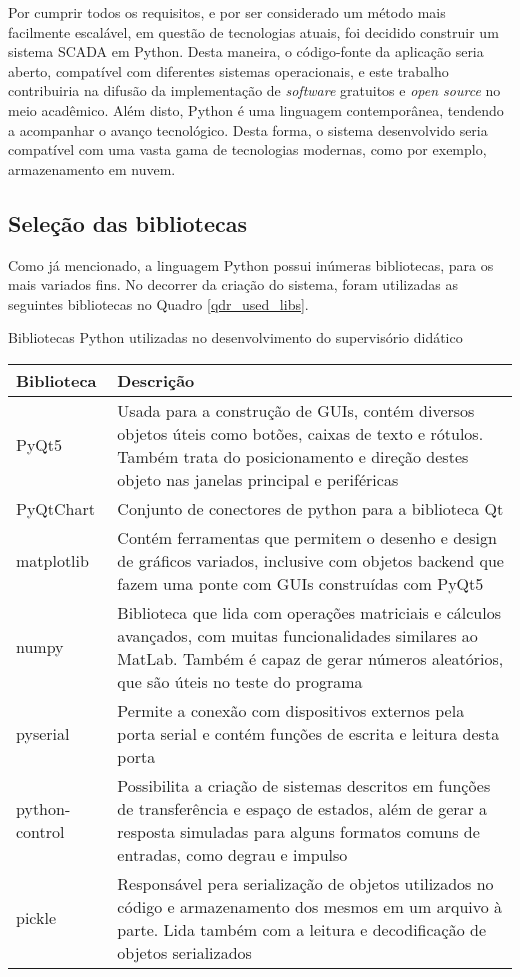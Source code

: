Por cumprir todos os requisitos, e por ser considerado um método mais facilmente escalável, em questão de tecnologias atuais, foi decidido construir um sistema SCADA em Python. Desta maneira, o código-fonte da aplicação seria aberto, compatível com diferentes sistemas operacionais, e este trabalho contribuiria na difusão da implementação de \textit{software} gratuitos e \textit{open source} no meio acadêmico. Além disto, Python é uma linguagem contemporânea, tendendo a acompanhar o avanço tecnológico. Desta forma, o sistema desenvolvido seria compatível com uma vasta gama de tecnologias modernas, como por exemplo, armazenamento em nuvem.

\subsection{Seleção das bibliotecas}

Como já mencionado, a linguagem Python possui inúmeras bibliotecas, para os mais variados fins. No decorrer da criação do sistema, foram utilizadas as seguintes bibliotecas no Quadro \ref{qdr_used_libs}.

\begin{quadro}
	\centering
	\caption{Bibliotecas Python utilizadas no desenvolvimento do supervisório didático}
	\begin{tabular}{|m{5em}|m{25em}|}
		\hline
		Biblioteca & Descrição \\
		\hline
		PyQt5 & Usada para a construção de GUIs, contém diversos objetos úteis como botões, caixas de texto e rótulos. Também trata do posicionamento e direção destes objeto nas janelas principal e periféricas \cite{pyqtdoc} \\
		\hline
		PyQtChart & Conjunto de conectores de python para a biblioteca Qt \\
		\hline
		matplotlib & Contém ferramentas que permitem o desenho e design de gráficos variados, inclusive com objetos backend que fazem uma ponte com GUIs construídas com PyQt5 \cite{hunter2007matplotlib} \\
		\hline
		numpy & Biblioteca que lida com operações matriciais e cálculos avançados, com muitas funcionalidades similares ao MatLab. Também é capaz de gerar números aleatórios, que são úteis no teste do programa \cite{harris2020array} \\
		\hline
		pyserial & Permite a conexão com dispositivos externos pela porta serial e contém funções de escrita e leitura desta porta \cite{pyserial} \\
		\hline
		python-control & Possibilita a criação de sistemas descritos em funções de transferência e espaço de estados, além de gerar a resposta simuladas para alguns formatos comuns de entradas, como degrau e impulso \cite{pythoncontrol} \\
		\hline
		pickle & Responsável pera serialização de objetos utilizados no código e armazenamento dos mesmos em um arquivo à parte. Lida também com a leitura e decodificação de objetos serializados \\
		\hline
	\end{tabular}
	\label{qdr_used_libs}
\end{quadro}

